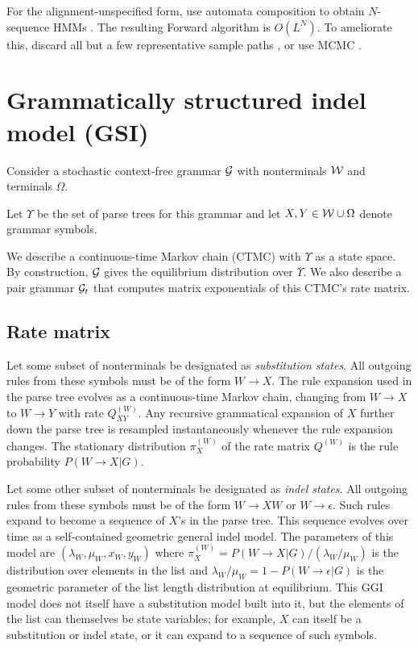 \documentclass{article}
\begin{document}
For the alignment-unspecified form, use automata composition to obtain $N$-sequence HMMs \cite{SilvestreRyanEtAl2020}.
The resulting Forward algorithm is $O(L^N)$.
To ameliorate this, discard all but a few representative sample paths \cite{WestessonEtAl2012},
or use MCMC \cite{RedelingsSuchard2007}.


\section{Grammatically structured indel model (GSI)}

Consider a stochastic context-free grammar ${\cal G}$
with nonterminals ${\cal W}$ and terminals $\Omega$.

Let $\Upsilon$ be the set of parse trees for this grammar
and let $X,Y \in {\cal W}\cup\Omega$ denote grammar symbols.

We describe a continuous-time Markov chain (CTMC) with $\Upsilon$ as a state space.
By construction, ${\cal G}$ gives the equilibrium distribution over $\Upsilon$.
We also describe a pair grammar ${\cal G}_t$ that computes matrix exponentials of this CTMC's rate matrix.

\subsection{Rate matrix}

Let some subset of nonterminals be designated as {\em substitution states}.
All outgoing rules from these symbols must be of the form $W \to X$.
The rule expansion used in the parse tree evolves as a continuous-time Markov chain,
changing from $W \to X$ to $W \to Y$ with rate $Q^{(W)}_{XY}$.
Any recursive grammatical expansion of $X$ further down the parse tree
is resampled instantaneously whenever the rule expansion changes.
The stationary distribution $\pi^{(W)}_X$ of the rate matrix $Q^{(W)}$ is the rule probability $P(W \to X|G)$.

Let some other subset of nonterminals be designated as {\em indel states}.
All outgoing rules from these symbols must be of the form $W \to X W$ or $W \to \epsilon$.
Such rules expand to become a sequence of $X$'s in the parse tree.
This sequence evolves over time as a self-contained geometric general indel model.
The parameters of this model are $(\lambda_W, \mu_W, x_W, y_W)$
where $\pi^{(W)}_X = P(W \to X|G) / (\lambda_W / \mu_W)$ is the distribution over elements in the list
and $\lambda_W / \mu_W = 1 - P(W \to \epsilon|G)$ is the geometric parameter of the list length distribution at equilibrium.
This GGI model does not itself have a substitution model built into it,
but the elements of the list can themselves be state variables;
for example, $X$ can itself be a substitution or indel state,
or it can expand to a sequence of such symbols.
\end{document}
